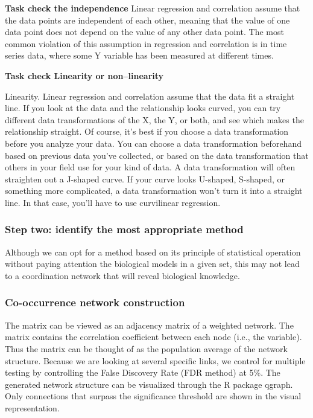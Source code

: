 \documentclass[a4paper]{article}
\begin{document}
\textbf{Task check the independence}
 Linear regression and correlation assume that the data points are independent of each other, meaning that the value of one data point does not depend on the value of any other data point. The most common violation of this assumption in regression and correlation is in time series data, where some Y variable has been measured at different times.


\textbf{Task check Linearity or non--linearity}

Linearity. Linear regression and correlation assume that the data fit a straight line. If you look at the data and the relationship looks curved, you can try different data transformations of the X, the Y, or both, and see which makes the relationship straight. Of course, it's best if you choose a data transformation before you analyze your data. You can choose a data transformation beforehand based on previous data you've collected, or based on the data transformation that others in your field use for your kind of data.
A data transformation will often straighten out a J-shaped curve. If your curve looks U-shaped, S-shaped, or something more complicated, a data transformation won't turn it into a straight line. In that case, you'll have to use curvilinear regression.

\subsubsection{Step two: identify the most appropriate method} 

Although we can opt for a method based on its principle of statistical operation without paying attention the biological models in a given set, this may not lead to a coordination network that will reveal biological knowledge.

\subsubsection{Co-occurrence network construction}

The matrix  can be viewed as an adjacency matrix of a weighted network. The matrix  contains the correlation coefficient  between each node (i.e., the variable). Thus the matrix  can be thought of as the population average of the network structure. Because we are looking at several specific links, we control for multiple testing by controlling the False Discovery Rate (FDR method) at 5\%. The generated network structure can be visualized through the R package qgraph. Only connections that surpass the significance threshold are shown in the visual representation.
\end{document}
